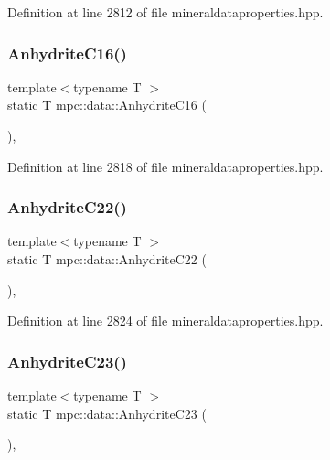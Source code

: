 Definition at line 2812 of file mineraldataproperties.\+hpp.

\mbox{\label{namespacempc_1_1data_a39694b2f1f5be98cb54a2351a99c1337}} 
\subsubsection{\texorpdfstring{Anhydrite\+C16()}{AnhydriteC16()}}
{\footnotesize\ttfamily template$<$typename T $>$ \\
static T mpc\+::data\+::\+Anhydrite\+C16 (\begin{DoxyParamCaption}{ }\end{DoxyParamCaption})\hspace{0.3cm}{\ttfamily [inline]}, {\ttfamily [static]}}



Definition at line 2818 of file mineraldataproperties.\+hpp.

\mbox{\label{namespacempc_1_1data_a4e2511b4ba420a2d87c990d2014207ba}} 
\subsubsection{\texorpdfstring{Anhydrite\+C22()}{AnhydriteC22()}}
{\footnotesize\ttfamily template$<$typename T $>$ \\
static T mpc\+::data\+::\+Anhydrite\+C22 (\begin{DoxyParamCaption}{ }\end{DoxyParamCaption})\hspace{0.3cm}{\ttfamily [inline]}, {\ttfamily [static]}}



Definition at line 2824 of file mineraldataproperties.\+hpp.

\mbox{\label{namespacempc_1_1data_aaeb1ee0bec3852e05014590b2055d49e}} 
\subsubsection{\texorpdfstring{Anhydrite\+C23()}{AnhydriteC23()}}
{\footnotesize\ttfamily template$<$typename T $>$ \\
static T mpc\+::data\+::\+Anhydrite\+C23 (\begin{DoxyParamCaption}{ }\end{DoxyParamCaption})\hspace{0.3cm}{\ttfamily [inline]}, {\ttfamily [static]}}



